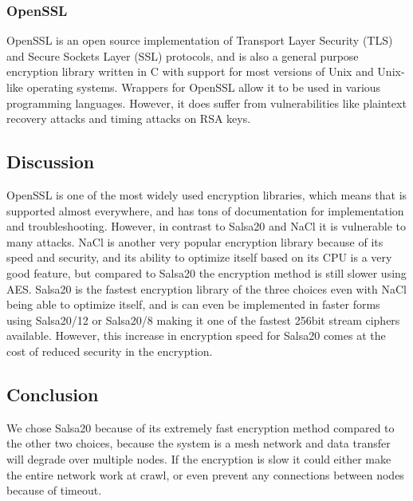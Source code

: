 \documentclass[onecolumn, draftclsnofoot,10pt, compsoc]{IEEEtran}
\begin{document}
\subsubsection{OpenSSL}
OpenSSL is an open source implementation of Transport Layer Security (TLS) and Secure Sockets Layer (SSL) protocols, and is also a general purpose encryption library written in C with support for most versions of Unix and Unix-like operating systems. Wrappers for OpenSSL allow it to be used in various programming languages. However, it does suffer from vulnerabilities like plaintext recovery attacks and timing attacks on RSA keys.




\subsection{Discussion}
OpenSSL is one of the most widely used encryption libraries, which means that is supported almost everywhere, and has tons of documentation for implementation and troubleshooting. However, in contrast to Salsa20 and NaCl it is vulnerable to many attacks. NaCl is another very popular encryption library because of its speed and security, and its ability to optimize itself based on its CPU is a very good feature, but compared to Salsa20 the encryption method is still slower using AES. Salsa20 is the fastest encryption library of the three choices even with NaCl being able to optimize itself, and is can even be implemented in faster forms using Salsa20/12 or Salsa20/8 making it one of the fastest 256bit stream ciphers available. However, this increase in encryption speed for Salsa20 comes at the cost of reduced security in the encryption.

\subsection{Conclusion}
We chose Salsa20 because of its extremely fast encryption method compared to the other two choices, because the system is a mesh network and data transfer will degrade over multiple nodes. If the encryption is slow it could either make the entire network work at crawl, or even prevent any connections between nodes because of timeout.
\end{document}
